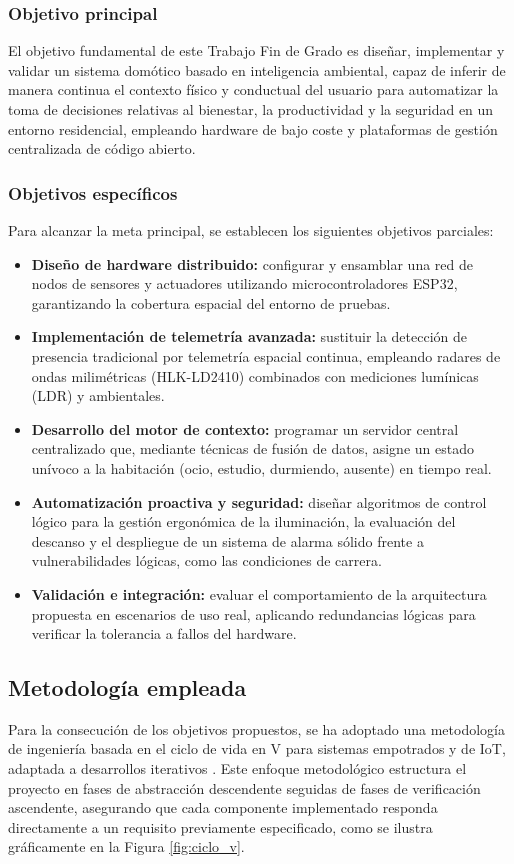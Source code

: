 \subsubsection{Objetivo principal}
El objetivo fundamental de este Trabajo Fin de Grado es diseñar, implementar y validar un sistema domótico basado en inteligencia ambiental, capaz de inferir de manera continua el contexto físico y conductual del usuario para automatizar la toma de decisiones relativas al bienestar, la productividad y la seguridad en un entorno residencial, empleando hardware de bajo coste y plataformas de gestión centralizada de código abierto.

\subsubsection{Objetivos específicos}
Para alcanzar la meta principal, se establecen los siguientes objetivos parciales:
\begin{itemize}
    \item \textbf{Diseño de hardware distribuido:} configurar y ensamblar una red de nodos de sensores y actuadores utilizando microcontroladores ESP32, garantizando la cobertura espacial del entorno de pruebas.
    \item \textbf{Implementación de telemetría avanzada:} sustituir la detección de presencia tradicional por telemetría espacial continua, empleando radares de ondas milimétricas (HLK-LD2410) combinados con mediciones lumínicas (LDR) y ambientales.
    \item \textbf{Desarrollo del motor de contexto:} programar un servidor central centralizado que, mediante técnicas de fusión de datos, asigne un estado unívoco a la habitación (ocio, estudio, durmiendo, ausente) en tiempo real.
    \item \textbf{Automatización proactiva y seguridad:} diseñar algoritmos de control lógico para la gestión ergonómica de la iluminación, la evaluación del descanso y el despliegue de un sistema de alarma sólido frente a vulnerabilidades lógicas, como las condiciones de carrera.
    \item \textbf{Validación e integración:} evaluar el comportamiento de la arquitectura propuesta en escenarios de uso real, aplicando redundancias lógicas para verificar la tolerancia a fallos del hardware.
\end{itemize}

\subsection{Metodología empleada}
Para la consecución de los objetivos propuestos, se ha adoptado una metodología de ingeniería basada en el ciclo de vida en V para sistemas empotrados y de IoT, adaptada a desarrollos iterativos \cite{sommerville2011software}. Este enfoque metodológico estructura el proyecto en fases de abstracción descendente seguidas de fases de verificación ascendente, asegurando que cada componente implementado responda directamente a un requisito previamente especificado, como se ilustra gráficamente en la Figura \ref{fig:ciclo_v}.

